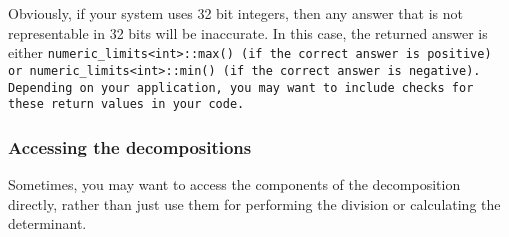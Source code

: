 Obviously, if your system uses 32 bit integers, then any answer that is not representable in
32 bits will be inaccurate.  In this case, the returned answer is either \tt{numeric_limits<int>::max()}
(if the correct answer is positive) or \tt{numeric_limits<int>::min()} (if the correct answer is
negative).  Depending on your application, you may want to include checks for these return values
in your code.


\subsubsection{Accessing the decompositions}
\label{Matrix_Division_Access}

Sometimes, you may want to access the components of the decomposition directly,
rather than just use them for performing the division or calculating the determinant.

